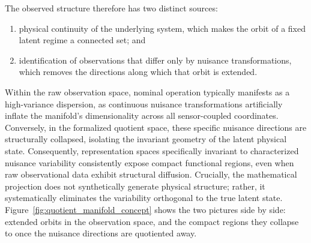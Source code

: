 \documentclass[a4paper]{cas-sc}
\begin{document}
The observed structure therefore has two distinct sources:

\begin{enumerate}[label=(\roman*),leftmargin=1.8em]
    \item physical continuity of the underlying system, which makes the orbit
          of a fixed latent regime a connected set; and
    \item identification of observations that differ only by nuisance
          transformations, which removes the directions along which that orbit
          is extended.
\end{enumerate}

Within the raw observation space, nominal operation typically manifests as a high-variance dispersion, as continuous nuisance transformations artificially inflate the manifold's dimensionality across all sensor-coupled coordinates. Conversely, in the formalized quotient space, these specific nuisance directions are structurally collapsed, isolating the invariant geometry of the latent physical state. Consequently, representation spaces specifically invariant to characterized nuisance variability consistently expose compact functional regions, even when raw observational data exhibit structural diffusion. Crucially, the mathematical projection does not synthetically generate physical structure; rather, it systematically eliminates the variability orthogonal to the true latent state.
Figure~\ref{fig:quotient_manifold_concept} shows the two pictures side by
side: extended orbits in the observation space, and the compact regions they
collapse to once the nuisance directions are quotiented away.
\end{document}
